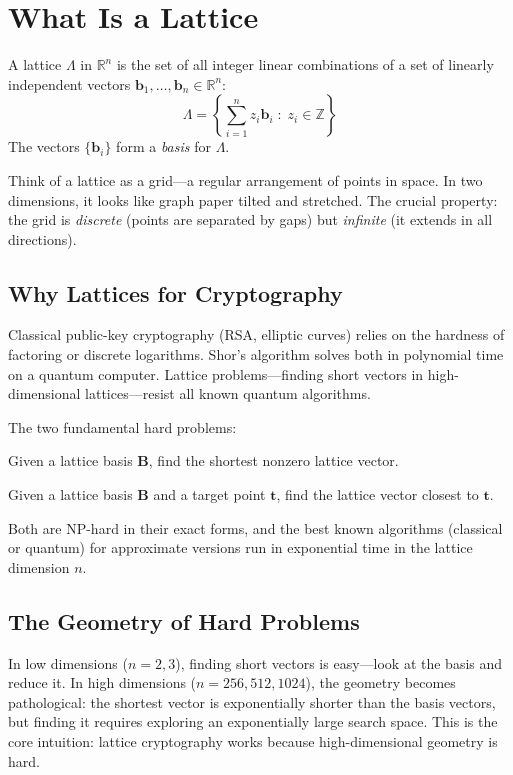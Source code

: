 \section{What Is a Lattice}


\begin{definition}[Lattice]
A lattice $\Lambda$ in $\mathbb{R}^n$ is the set of all integer linear combinations of
a set of linearly independent vectors $\mathbf{b}_1, \ldots, \mathbf{b}_n \in \mathbb{R}^n$:
\[
\Lambda = \left\{ \sum_{i=1}^n z_i \mathbf{b}_i \;:\; z_i \in \mathbb{Z} \right\}
\]
The vectors $\{\mathbf{b}_i\}$ form a \emph{basis} for $\Lambda$.
\end{definition}

Think of a lattice as a grid---a regular arrangement of points in space. In two dimensions,
it looks like graph paper tilted and stretched. The crucial property: the grid is
\emph{discrete} (points are separated by gaps) but \emph{infinite} (it extends in all
directions).

\subsection{Why Lattices for Cryptography}

Classical public-key cryptography (RSA, elliptic curves) relies on the hardness of
factoring or discrete logarithms. Shor's algorithm solves both in polynomial time on a
quantum computer. Lattice problems---finding short vectors in high-dimensional
lattices---resist all known quantum algorithms.

The two fundamental hard problems:

\begin{definition}
Given a lattice basis $\mathbf{B}$, find the shortest nonzero lattice vector.
\end{definition}

\begin{definition}
Given a lattice basis $\mathbf{B}$ and a target point $\mathbf{t}$, find the lattice
vector closest to $\mathbf{t}$.
\end{definition}

Both are NP-hard in their exact forms, and the best known algorithms (classical or
quantum) for approximate versions run in exponential time in the lattice dimension $n$.

\subsection{The Geometry of Hard Problems}

In low dimensions ($n = 2, 3$), finding short vectors is easy---look at the basis and
reduce it. In high dimensions ($n = 256, 512, 1024$), the geometry becomes pathological:
the shortest vector is exponentially shorter than the basis vectors, but finding it
requires exploring an exponentially large search space. This is the core intuition:
lattice cryptography works because high-dimensional geometry is hard.

